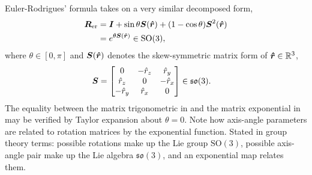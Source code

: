 Euler-Rodrigues' formula takes on a very similar decomposed form,
%
\begin{align}
\mat{R}_{\mathrm{er}}
&= \I + \sin\theta{}\mat{S}(\dhat{r}) + (1-\cos\theta)\mat{S}^2(\dhat{r})\label{IV_eq_euler_rodrigues_decomposed} \\
&= e^{\theta{}\mat{S}(\dhat{r})} \in\mathrm{SO}(3)\label{IV_eq_euler_rodrigues_exponential},
\end{align}
%
where $\theta\in[0,\pi]$ and $\boldsymbol{S}(\boldsymbol{\hat{r}})$ denotes the skew-symmetric matrix form of $\boldsymbol{\hat{r}}\in\mathbb{R}^3$,
%
\begin{align}
\mat{S}
&= \bmat{
0 & -\hat{r}_z & \hat{r}_y \\
\hat{r}_z & 0 & -\hat{r}_x \\
-\hat{r}_y & \hat{r}_x & 0
} \in\mathfrak{so}(3).
\end{align}
%
The equality between the matrix trigonometric in  and the matrix exponential in  may be verified by Taylor expansion about $\theta=0$. Note how axis-angle parameters are related to rotation matrices by the exponential function. Stated in group theory terms: possible rotations make up the Lie group $\mathrm{SO}(3)$, possible axis-angle pair make up the Lie algebra $\mathfrak{so}(3)$, and an exponential map relates them.


% 




%
% 


